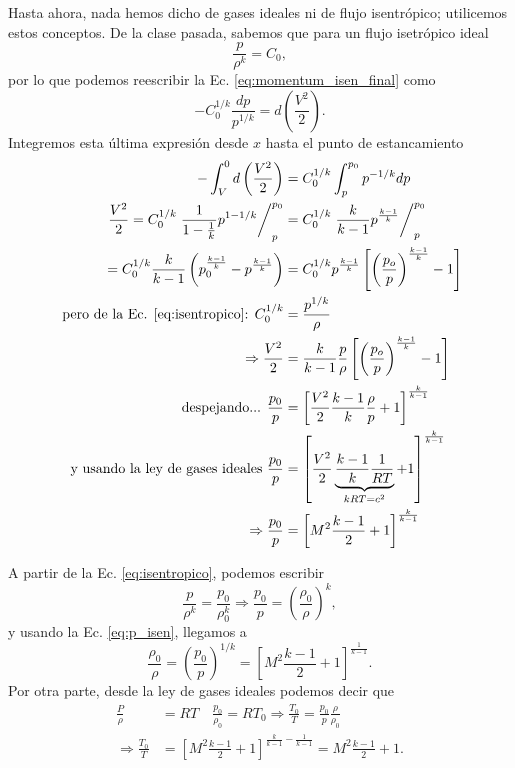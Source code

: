 Hasta ahora, nada hemos dicho de gases ideales ni de flujo isentrópico; utilicemos estos conceptos.
De la clase pasada, sabemos que para un flujo isetrópico ideal
%
\begin{equation}\label{eq:isentropico}
\frac{p}{\rho^k} = C_0,
\end{equation}
%
por lo que podemos reescribir la Ec. \eqref{eq:momentum_isen_final} como
%
\begin{equation}
-C_0^{1/k}\frac{dp}{p^{1/k}} = d\left(\frac{V^2}{2}\right).
\end{equation}
%
Integremos esta última expresión desde $x$ hasta el punto de estancamiento
%
\begin{align}\label{eq:p_isen}
-\int_V^0d\left(\frac{V^2}{2}\right) &= C_0^{1/k}\int_p^{p_0}p^{-1/k}dp\nonumber\\
\frac{V^2}{2} = C_0^{1/k} \left.\frac{1}{1-\frac{1}{k}}p^{1-1/k}\right/_p^{p_0}&= C_0^{1/k}\left.\frac{k}{k-1}p^{\frac{k-1}{k}}\right/_p^{p_0}\nonumber\\
=C_0^{1/k}\frac{k}{k-1}\left(p_0^{\frac{k-1}{k}}-p^{\frac{k-1}{k}}\right) &= C_0^{1/k}p^{\frac{k-1}{k}}\left[\left(\frac{p_o}{p}\right)^{\frac{k-1}{k}}-1\right]\\
\text{ pero de la Ec. \eqref{eq:isentropico}:   } C_0^{1/k} &= \frac{p^{1/k}}{\rho}\nonumber\\
\Rightarrow\frac{V^2}{2}&=\frac{k}{k-1}\frac{p}{\rho}\left[\left(\frac{p_o}{p}\right)^{\frac{k-1}{k}}-1\right]\nonumber\\
\text{despejando...   } \frac{p_0}{p} &= \left[\frac{V^2}{2}\frac{k-1}{k}\frac{\rho}{p}+1\right]^\frac{k}{k-1}\nonumber\\
\text{y usando la ley de gases ideales   } \frac{p_0}{p} &= \left[\frac{V^2}{2}\underbrace{\frac{k-1}{k}\frac{1}{RT}}_{kRT=c^2}+1\right]^\frac{k}{k-1}\nonumber\\
\Rightarrow \frac{p_0}{p} &= \left[M^2\frac{k-1}{2}+1\right]^\frac{k}{k-1}
\end{align}

A partir de la Ec. \eqref{eq:isentropico}, podemos escribir
%
\begin{equation}
\frac{p}{\rho^k} = \frac{p_0}{\rho_0^k} \Rightarrow \frac{p_0}{p} = \left(\frac{\rho_0}{\rho}\right)^k,
\end{equation}
%
y usando la Ec. \eqref{eq:p_isen}, llegamos a
%
\begin{equation}
\frac{\rho_0}{\rho} = \left(\frac{p_0}{p}\right)^{1/k} = \left[M^2\frac{k-1}{2}+1\right]^\frac{1}{k-1}.
\end{equation}
%
Por otra parte, desde la ley de gases ideales podemos decir que
%
\begin{align}
\frac{P}{\rho}&=RT \quad \frac{p_0}{\rho_0} = RT_0\Rightarrow \frac{T_0}{T} = \frac{p_0}{p}\frac{\rho}{\rho_0}\nonumber\\
\Rightarrow \frac{T_0}{T} &= \left[M^2\frac{k-1}{2}+1\right]^{\frac{k}{k-1}-\frac{1}{k-1}} = M^2\frac{k-1}{2}+1.
\end{align}


